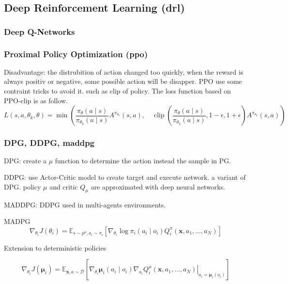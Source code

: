 \subsection{Deep Reinforcement Learning (\gls{drl})}
\subsubsection{Deep Q-Networks}

\subsubsection{Proximal Policy Optimization (\gls{ppo})}
Disadvantage: the distrubition of action changed too quickly, when the reward is always positiv or negative, some possible action will be disapper.
PPO use some contraint tricks to avoid it. such as clip of policy. The loss function based on PPO-clip is as follow.
\begin{equation}
L\left(s, a, \theta_{k}, \theta\right)=\min \left(\frac{\pi_{\theta}(a \mid s)}{\pi_{\theta_{k}}(a \mid s)} A^{\pi_{\theta_{k}}}(s, a), \quad \operatorname{clip}\left(\frac{\pi_{\theta}(a \mid s)}{\pi_{\theta_{k}}(a \mid s)}, 1-\epsilon, 1+\epsilon\right) A^{\pi_{\theta_{k}}}(s, a)\right)
\end{equation} 

\subsubsection{DPG, DDPG, \gls{maddpg}} \label{background:maddpg}

DPG: create a $\mu$ function to determine the action instead the sample in PG.

DDPG: use Actor-Critic model to create target and execute network. a variant of DPG. policy $\mu$ and critic $Q_\mu$ are approximated with deep neural networks.

MADDPG: DDPG used in multi-agents environments.

MADPG
\begin{equation}
\nabla_{\theta_{i}} J\left(\theta_{i}\right)=\mathbb{E}_{s \sim p^{\mu}, a_{i} \sim \pi_{i}}\left[\nabla_{\theta_{i}} \log \pi_{i}\left(a_{i} \mid o_{i}\right) Q_{i}^{\pi}\left(\mathbf{x}, a_{1}, \ldots, a_{N}\right)\right]
\end{equation}

Extension to deterministic policies

\begin{equation}
\nabla_{\theta_{i}} J\left(\boldsymbol{\mu}_{i}\right)=\mathbb{E}_{\mathbf{x}, a \sim \mathcal{D}}\left[\left.\nabla_{\theta_{i}} \boldsymbol{\mu}_{i}\left(a_{i} \mid o_{i}\right) \nabla_{a_{i}} Q_{i}^{\mu}\left(\mathbf{x}, a_{1}, \ldots, a_{N}\right)\right|_{a_{i}=\boldsymbol{\mu}_{i}\left(o_{i}\right)}\right]
\end{equation}

